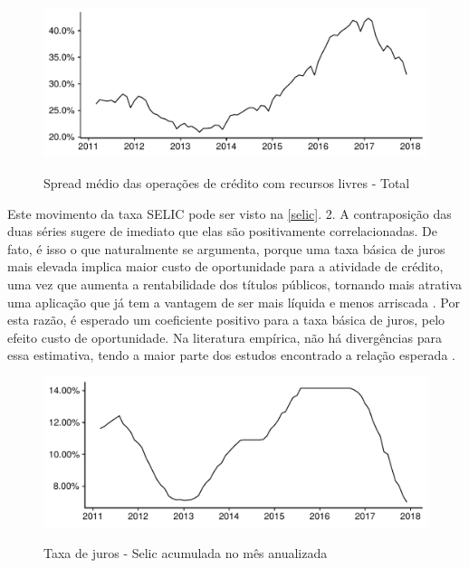 \documentclass[a4paper,
               article,
               12pt,
               openany,
               oneside,
               english,
               brazil]{abntex2}
\numberwithin{equation}{section}
\begin{document}
    \begin{figure}[h]
        \centering
        \caption{Spread médio das operações de crédito com recursos livres - Total}
        \includegraphics[width = \textwidth, scale=0.75]{Spread.pdf}
        \label{spread}
    \end{figure}

    Este movimento da taxa SELIC pode ser visto na \autoref{selic}. 2. A contraposição das duas séries sugere de imediato que elas são positivamente correlacionadas. De fato, é isso o que naturalmente se argumenta, porque uma taxa básica de juros mais elevada implica maior custo de oportunidade para a atividade de crédito, uma vez que aumenta a rentabilidade dos títulos públicos, tornando mais atrativa uma aplicação que já tem a vantagem de ser mais líquida e menos arriscada \cite[p.~372]{oliveira2007}. Por esta razão, é esperado um coeficiente positivo para a taxa básica de juros, pelo efeito custo de oportunidade. Na literatura empírica, não há divergências para essa estimativa, tendo a maior parte dos estudos encontrado a relação esperada \cite[p.~233-234]{leal07}.

    \begin{figure}[h]
        \centering
        \caption{Taxa de juros - Selic acumulada no mês anualizada}
        \includegraphics[width = \textwidth, scale=0.75]{Selic.pdf}
        \label{selic}
    \end{figure}
\end{document}
